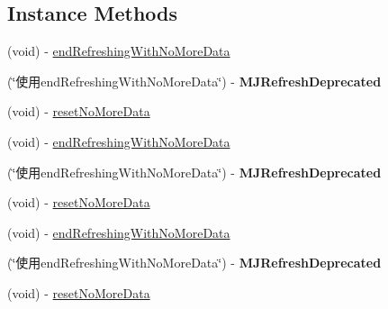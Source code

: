 \subsection*{Instance Methods}
\begin{DoxyCompactItemize}
\item 
(void) -\/ \mbox{\hyperlink{interface_m_j_refresh_footer_a1494271a77136e3b12f5ebc8be8dd383}{end\+Refreshing\+With\+No\+More\+Data}}
\item 
\mbox{\label{interface_m_j_refresh_footer_a11aba3924f250530cc8d251234d30c27}} 
(\char`\"{}使用end\+Refreshing\+With\+No\+More\+Data\char`\"{}) -\/ {\bfseries M\+J\+Refresh\+Deprecated}
\item 
(void) -\/ \mbox{\hyperlink{interface_m_j_refresh_footer_acb5311ed278d03315d8c00a538360ecc}{reset\+No\+More\+Data}}
\item 
(void) -\/ \mbox{\hyperlink{interface_m_j_refresh_footer_a1494271a77136e3b12f5ebc8be8dd383}{end\+Refreshing\+With\+No\+More\+Data}}
\item 
\mbox{\label{interface_m_j_refresh_footer_a11aba3924f250530cc8d251234d30c27}} 
(\char`\"{}使用end\+Refreshing\+With\+No\+More\+Data\char`\"{}) -\/ {\bfseries M\+J\+Refresh\+Deprecated}
\item 
(void) -\/ \mbox{\hyperlink{interface_m_j_refresh_footer_acb5311ed278d03315d8c00a538360ecc}{reset\+No\+More\+Data}}
\item 
(void) -\/ \mbox{\hyperlink{interface_m_j_refresh_footer_a1494271a77136e3b12f5ebc8be8dd383}{end\+Refreshing\+With\+No\+More\+Data}}
\item 
\mbox{\label{interface_m_j_refresh_footer_a11aba3924f250530cc8d251234d30c27}} 
(\char`\"{}使用end\+Refreshing\+With\+No\+More\+Data\char`\"{}) -\/ {\bfseries M\+J\+Refresh\+Deprecated}
\item 
(void) -\/ \mbox{\hyperlink{interface_m_j_refresh_footer_acb5311ed278d03315d8c00a538360ecc}{reset\+No\+More\+Data}}
\end{DoxyCompactItemize}
